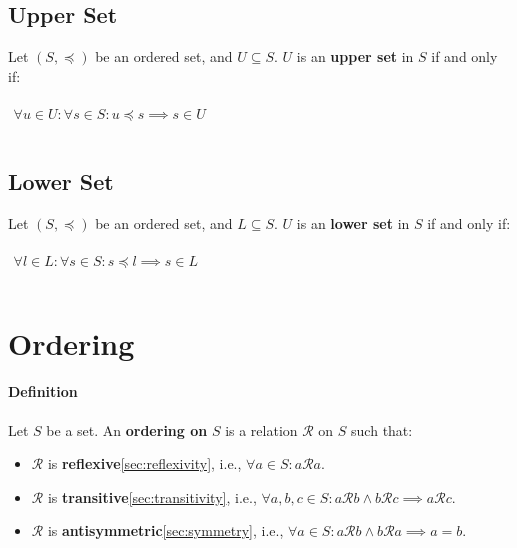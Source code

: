 \subsection{Upper Set}
\label{sec:upper-set}

Let $(S, \preceq)$ be an ordered set, and $U \subseteq S$. $U$ is an
\textbf{upper set} in $S$ if and only if:

\begin{math}
  \begin{array}{c}
    \\
    \forall u \in U : \forall s \in S: u \preceq s \implies s \in U\\
    \\
  \end{array}
\end{math}

\subsection{Lower Set}
\label{sec:lower-set}

Let $(S, \preceq)$ be an ordered set, and $L \subseteq S$. $U$ is an
\textbf{lower set} in $S$ if and only if:

\begin{math}
  \begin{array}{c}
    \\
    \forall l \in L : \forall s \in S: s \preceq l \implies s \in L\\
    \\
  \end{array}
\end{math}



\newpage
\section{Ordering}
\label{sec:ordering}

\paragraph{Definition}

Let $S$ be a set. An \textbf{ordering on} $S$ is a relation
$\mathcal{R}$ on $S$ such that:

\begin{itemize}
\item $\mathcal{R}$ is \textbf{reflexive}\ref{sec:reflexivity}, i.e.,
  $\forall a \in S: a \mathcal{R} a$.
\item $\mathcal{R}$ is \textbf{transitive}\ref{sec:transitivity},
  i.e.,
  $\forall a, b, c \in S: a \mathcal{R} b \land b \mathcal{R} c
  \implies a \mathcal{R} c$.
\item $\mathcal{R}$ is \textbf{antisymmetric}\ref{sec:symmetry}, i.e.,
  $\forall a \in S : a \mathcal{R} b \land b \mathcal{R} a \implies a
  = b$.
\end{itemize}

